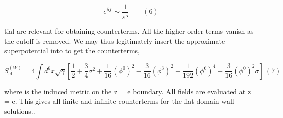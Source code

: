 \documentclass{article}
\begin{document}
\begin{equation}
e ^ { 5 f } \sim \frac { 1 } { \varepsilon ^ { 5 } } \qquad ( 6 )
\end{equation}


tial are relevant for obtaining counterterms. All the higher-order terms vanish as the cutoff
is removed. We may thus legitimately insert the approximate superpotential into to get the
counterterms,


\begin{equation}
S _ { \mathrm { c l } } ^ { ( W ) } = 4 \int d ^ { 6 } x \sqrt { \gamma } \left [ \frac { 1 } { 2 } + \frac { 3 } { 4 } \sigma ^ { 2 } + \frac { 1 } { 1 6 } ( \phi ^ { 0 } ) ^ { 2 } - \frac { 3 } { 1 6 } ( \phi ^ { 3 } ) ^ { 2 } + \frac { 1 } { 1 9 2 } ( \phi ^ { 6 } ) ^ { 4 } - \frac { 3 } { 1 6 } ( \phi ^ { 0 } ) ^ { 2 } \sigma \right ] ~ ( 7 )
\end{equation}


where  is the induced metric on the z = e boundary. All fields are evaluated at z = e. This
gives all finite and infinite counterterms for the flat domain wall solutions..
\end{document}
